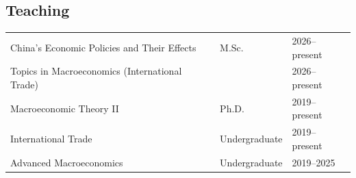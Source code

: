 \documentclass[11pt]{res}
\begin{document}
\begin{resume}
\section{\bf Teaching}
\vspace{0.1in}
\begin{tabular}{lll}
\hspace{-0.42in} China's Economic Policies and Their Effects
  & M.Sc. & 2026--present\\
\hspace{-0.42in} Topics in Macroeconomics (International Trade)
  & & 2026--present\\
\hspace{-0.42in} Macroeconomic Theory II
  & Ph.D. & 2019--present\\
\hspace{-0.42in} International Trade
  & Undergraduate & 2019--present\\
\hspace{-0.42in} Advanced Macroeconomics
  & Undergraduate & 2019--2025
\end{tabular}

\vfill
\noindent\hspace{-0.42in}

\end{resume}
\end{document}

